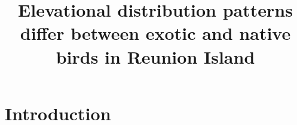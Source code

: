 \documentclass{article}
\title{Elevational distribution patterns differ between exotic and native birds in Reunion Island}
\begin{document}

\maketitle

\noindent

\begin{abstract}
\end{abstract}


\section*{Introduction}
\end{document}
